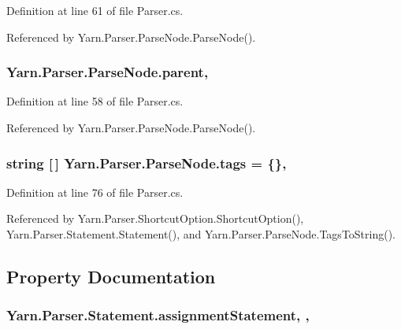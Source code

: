 Definition at line 61 of file Parser.\-cs.



Referenced by Yarn.\-Parser.\-Parse\-Node.\-Parse\-Node().

\hypertarget{a00138_af313a82103fcc2ff5a177dbb06b92f7b}{
\subsubsection[{parent}]{ Yarn.\-Parser.\-Parse\-Node.\-parent\hspace{0.3cm}{\ttfamily [package]}, {\ttfamily [inherited]}}}\label{a00138_af313a82103fcc2ff5a177dbb06b92f7b}


Definition at line 58 of file Parser.\-cs.



Referenced by Yarn.\-Parser.\-Parse\-Node.\-Parse\-Node().

\hypertarget{a00138_a58b3a15788fd2d4127d73619dc6d04ae}{
\subsubsection[{tags}]{\setlength{\rightskip}{0pt plus 5cm}string \mbox{[}$\,$\mbox{]} Yarn.\-Parser.\-Parse\-Node.\-tags = \{\}\hspace{0.3cm}{\ttfamily [package]}, {\ttfamily [inherited]}}}\label{a00138_a58b3a15788fd2d4127d73619dc6d04ae}


Definition at line 76 of file Parser.\-cs.



Referenced by Yarn.\-Parser.\-Shortcut\-Option.\-Shortcut\-Option(), Yarn.\-Parser.\-Statement.\-Statement(), and Yarn.\-Parser.\-Parse\-Node.\-Tags\-To\-String().



\subsection{Property Documentation}
\hypertarget{a00156_a7fa97a80f1b9313bc2bd4194e3f75759}{
\subsubsection[{assignment\-Statement}]{ Yarn.\-Parser.\-Statement.\-assignment\-Statement\hspace{0.3cm}{\ttfamily [get]}, {\ttfamily [set]}, {\ttfamily [package]}}}\label{a00156_a7fa97a80f1b9313bc2bd4194e3f75759}


